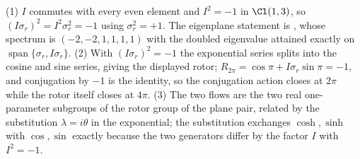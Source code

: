 (1) $I$ commutes with every even element and $I^{2} = -1$ in $\Cl(1,3)$, so $(I\sigma_r)^{2} = I^{2}\sigma_r^{2} = -1$ using $\sigma_r^{2} = +1$. The eigenplane statement is \cite[Thm.~6.1]{ButlerT5}, whose spectrum is $(-2,-2,1,1,1,1)$ with the doubled eigenvalue attained exactly on $\operatorname{span}\{\sigma_r, I\sigma_r\}$. (2) With $(I\sigma_r)^{2} = -1$ the exponential series splits into the cosine and sine series, giving the displayed rotor; $R_{2\pi} = \cos\pi + I\sigma_r\sin\pi = -1$, and conjugation by $-1$ is the identity, so the conjugation action closes at $2\pi$ while the rotor itself closes at $4\pi$. (3) The two flows are the two real one-parameter subgroups of the rotor group of the plane pair, related by the substitution $\lambda = i\theta$ in the exponential; the substitution exchanges $\cosh, \sinh$ with $\cos, \sin$ exactly because the two generators differ by the factor $I$ with $I^{2} = -1$.
